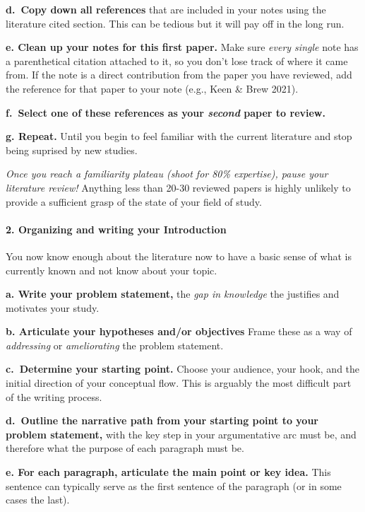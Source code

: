 \documentclass[
]{book}
\begin{document}
\textbf{d.~Copy down all references} that are included in your notes using the literature cited section. This can be tedious but it will pay off in the long run.

\textbf{e. Clean up your notes for this first paper.} Make sure \emph{every single} note has a parenthetical citation attached to it, so you don't lose track of where it came from. If the note is a direct contribution from the paper you have reviewed, add the reference for that paper to your note (e.g., Keen \& Brew 2021).

\textbf{f.~Select one of these references as your \emph{second} paper to review.}

\textbf{g. Repeat.} Until you begin to feel familiar with the current literature and stop being suprised by new studies.

\emph{Once you reach a familiarity plateau (shoot for 80\% expertise), pause your literature review!} Anything less than 20-30 reviewed papers is highly unlikely to provide a sufficient grasp of the state of your field of study.

\hypertarget{organizing-and-writing-your-introduction}{%
\paragraph{2. Organizing and writing your Introduction}\label{organizing-and-writing-your-introduction}}

You now know enough about the literature now to have a basic sense of what is currently known and not know about your topic.

\textbf{a. Write your problem statement,} the \emph{gap in knowledge} the justifies and motivates your study.

\textbf{b. Articulate your hypotheses and/or objectives} Frame these as a way of \emph{addressing} or \emph{ameliorating} the problem statement.

\textbf{c.~Determine your starting point.} Choose your audience, your hook, and the initial direction of your conceptual flow. This is arguably the most difficult part of the writing process.

\textbf{d.~Outline the narrative path from your starting point to your problem statement,} with the key step in your argumentative arc must be, and therefore what the purpose of each paragraph must be.

\textbf{e. For each paragraph, articulate the main point or key idea.} This sentence can typically serve as the first sentence of the paragraph (or in some cases the last).
\end{document}
